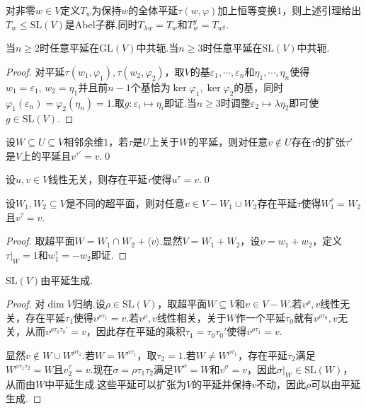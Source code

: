 对非零$w\in V$定义$T_w$为保持$w$的全体平延$\tau(w,\varphi)$加上恒等变换$1$，则上述引理给出$T_w\le\mathrm{SL}(V)$是Abel子群.同时$T_{\lambda w}=T_w$和$T_w^g=T_{w^g}$.

\begin{lemma}
	当$n\ge 2$时任意平延在$\mathrm{GL}(V)$中共轭.当$n\ge 3$时任意平延在$\mathrm{SL}(V)$中共轭.
\end{lemma}
\begin{proof}
	对平延$\tau(w_1,\varphi_1),\tau(w_2,\varphi_2)$，取$V$的基$\varepsilon_1,\cdots,\varepsilon_n$和$\eta_1,\cdots,\eta_n$使得$w_1=\varepsilon_1,\,w_2=\eta_1$并且前$n-1$个基恰为$\ker\varphi_1,\ker\varphi_2$的基，同时$\varphi_1(\varepsilon_n)=\varphi_2(\eta_n)=1$.取$g\colon\varepsilon_i\mapsto\eta_i$即证.当$n\ge 3$时调整$\varepsilon_2\mapsto\lambda\eta_2$即可使$g\in\mathrm{SL}(V)$.
\end{proof}
\begin{lemma}
	设$W\subseteq U\subseteq V$相邻余维$1$，若$\tau$是$U$上关于$W$的平延，则对任意$v\notin U$存在$\tau$的扩张$\tau'$是$V$上的平延且$v^{\tau'}=v$.\qed
\end{lemma}
\begin{lemma}
	设$u,v\in V$线性无关，则存在平延$\tau$使得$u^\tau=v$.\qed
\end{lemma}
\begin{lemma}
	设$W_1,W_2\subseteq V$是不同的超平面，则对任意$v\in V-W_1\cup W_2$存在平延$\tau$使得$W_1^\tau=W_2$且$v^\tau=v$.
\end{lemma}
\begin{proof}
	取超平面$W=W_1\cap W_2+\langle v\rangle$.显然$V=W_1+W_2$，设$v=w_1+w_2$，定义$\tau|_W=1$和$w_1^\tau=-w_2$即证.
\end{proof}
\begin{prop}
	$\mathrm{SL}(V)$由平延生成.
\end{prop}
\begin{proof}
	对$\dim V$归纳.设$\rho\in\mathrm{SL}(V)$，取超平面$W\subseteq V$和$v\in V-W$.若$v^\rho,v$线性无关，存在平延$\tau_1$使得$v^{\rho\tau_1}=v$.若$v^\rho,v$线性相关，关于$W$作一个平延$\tau_0$就有$v^{\rho\tau_0},v$无关，从而$v^{\rho\tau_0\tau_0'}=v$，因此存在平延的乘积$\tau_1=\tau_0\tau_0'$使得$v^{\rho\tau_1}=v$.

	显然$v\notin W\cup W^{\rho\tau_1}$.若$W=W^{\rho\tau_1}$，取$\tau_2=1$.若$W\ne W^{\rho\tau_1}$，存在平延$\tau_2$满足$W^{\rho\tau_1\tau_2}=W$且$v^\tau_2=v$.现在$\sigma=\rho\tau_1\tau_2$满足$W^\sigma=W$和$v^\sigma=v$，因此$\sigma|_W\in\mathrm{SL}(W)$，从而由$W$中平延生成.这些平延可以扩张为$V$的平延并保持$v$不动，因此$\rho$可以由平延生成.
\end{proof}
